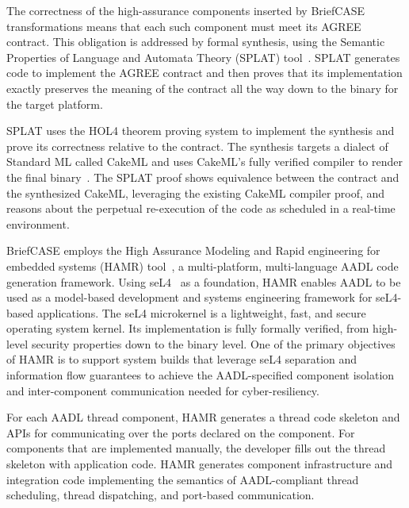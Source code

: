 The correctness of the high-assurance components inserted by BriefCASE transformations means that each such component must meet its AGREE contract. This obligation is addressed by formal synthesis, using the Semantic Properties of Language and Automata Theory (SPLAT) tool~\cite{case-models-2021}. SPLAT generates code to implement the AGREE contract and then proves that its implementation exactly preserves the meaning of the contract all the way down to the binary for the target platform.

SPLAT uses the HOL4 theorem proving system to implement the synthesis and prove its correctness relative to the contract. The synthesis targets a dialect of Standard ML called CakeML and uses CakeML’s fully verified compiler to render the final binary~\cite{cakeml}. 
The SPLAT proof shows equivalence between the contract and the synthesized CakeML, leveraging the existing CakeML compiler proof, and reasons about the perpetual re-execution of the code as scheduled in a real-time environment.

BriefCASE employs the High Assurance Modeling and Rapid engineering for embedded systems (HAMR) tool~\cite{hamr}, a multi-platform, multi-language AADL code generation framework. 
Using seL4~\cite{sel4-sosp09} as a foundation, HAMR enables AADL to be used as a model-based development and systems engineering framework for seL4-based applications. 
%
The seL4 microkernel is a lightweight, fast, and secure operating system kernel. Its implementation is fully formally verified, from high-level security properties down to the binary level.
%
One of the primary objectives of HAMR is to support system builds that leverage seL4 separation and information flow guarantees to achieve the AADL-specified component isolation and inter-component communication needed for cyber-resiliency. 

For each AADL thread component, HAMR generates a thread code skeleton and APIs for communicating over the ports declared on the component. For components that are implemented manually, the developer fills out the thread skeleton with application code. 
%
HAMR generates component infrastructure and integration code implementing the semantics of AADL-compliant thread scheduling, thread dispatching, and port-based communication. 


